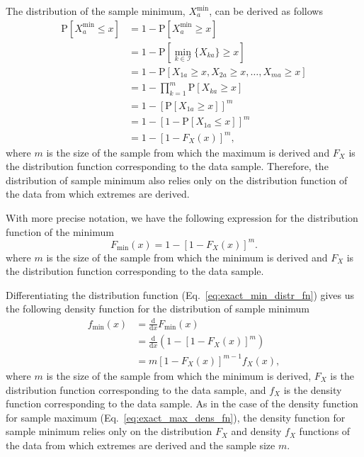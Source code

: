 \documentclass[aos]{imsart}
\begin{document}
The distribution of the sample minimum, $X^\text{min}_a$, can be derived as follows
%
\begin{equation}\label{eq:exact_min}
\begin{aligned}
\text{P}[X^\text{min}_a \leq x] &= 1 - \text{P}[X^\text{min}_a \geq x] \\
&= 1 - \text{P}\left[\min_{k \in \mathcal{I}}\{X_{ka}\} \geq x\right] \\
&= 1 - \text{P}[X_{1a} \geq x, X_{2a} \geq x, \dots, X_{ma} \geq x] \\
&= 1 - \prod_{k=1}^{m}\text{P}[X_{ka} \geq x] \\
&= 1 - \left[\text{P}[X_{1a} \geq x]\right]^m \\
&= 1 - \left[1 - \text{P}[X_{1a} \leq x]\right]^m \\
&= 1 - \left[1 - F_X(x)\right]^m,
\end{aligned}
\end{equation}
%
where $m$ is the size of the sample from which the maximum is derived and $F_X$ is the distribution function corresponding to the data sample. Therefore, the distribution of sample minimum also relies only on the distribution function of the data from which extremes are derived.

With more precise notation, we have the following expression for the distribution function of the minimum
%
\begin{equation}\label{eq:exact_min_distr_fn}
F_\text{min}(x) = 1 - [1 - F_X(x)]^m.
\end{equation}
%
where $m$ is the size of the sample from which the minimum is derived and $F_X$ is the distribution function corresponding to the data sample.

Differentiating the distribution function (Eq.~\ref{eq:exact_min_distr_fn}) gives us the following density function for the distribution of sample minimum
%
\begin{equation}\label{eq:exact_min_dens_fn}
\begin{aligned}
f_\text{min}(x) &= \frac{\text{d}}{\text{d}x} F_\text{min}(x) \\
&= \frac{\text{d}}{\text{d}x} \left(1 - [1 - F_X(x)]^m\right) \\
&= m\left[1 - F_X(x)\right]^{m-1}f_X(x),
\end{aligned}
\end{equation}
%
where $m$ is the size of the sample from which the minimum is derived, $F_X$ is the distribution function corresponding to the data sample, and $f_X$ is the density function corresponding to the data sample. As in the case of the density function for sample maximum (Eq.~\ref{eq:exact_max_dens_fn}), the density function for sample minimum relies only on the distribution $F_X$ and density $f_X$ functions of the data from which extremes are derived and the sample size $m$.
\end{document}
